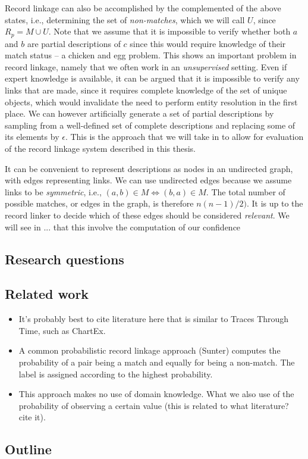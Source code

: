 Record linkage can also be accomplished by the complemented of the above states, i.e., determining the set of \emph{non-matches}, which we will call $U$, since $R_{p} = M \cup U$.
Note that we assume that it is impossible to verify whether both $a$ and $b$ are partial descriptions of $c$ since this would require knowledge of their match status -- a chicken and egg problem.
This shows an important problem in record linkage, namely that we often work in an \emph{unsupervised} setting.
Even if expert knowledge is available, it can be argued that it is impossible to verify any links that are made, since it requires complete knowledge of the set of unique objects, which would invalidate the need to perform entity resolution in the first place.
We can however artificially generate a set of partial descriptions by sampling from a well-defined set of complete descriptions and replacing some of its elements by $\epsilon$.
This is the approach that we will take in  to allow for evaluation of the record linkage system described in this thesis.

It can be convenient to represent descriptions as nodes in an undirected graph, with edges representing links.
We can use undirected edges because we assume links to be \emph{symmetric}, i.e., $(a, b) \in M \Leftrightarrow (b, a) \in M$.
The total number of possible matches, or edges in the graph, is therefore $n(n-1)/2)$.
It is up to the record linker to decide which of these edges should be considered \emph{relevant}.
We will see in ...  that this involve the computation of our confidence 





\subsection{Research questions}
\label{sec:research_questions}




\subsection{Related work}
\label{sec:related_work}

\begin{itemize}
    \item It's probably best to cite literature here that is similar to Traces Through Time, such as ChartEx.
    \item A common probabilistic record linkage approach (Sunter) computes the probability of a pair being a match and equally for being a non-match. The label is assigned according to the highest probability.
    \item This approach makes no use of domain knowledge. What we also use of the probability of observing a certain value (this is related to what literature? cite it).
\end{itemize}




\subsection{Outline}
\label{sec:outline}
